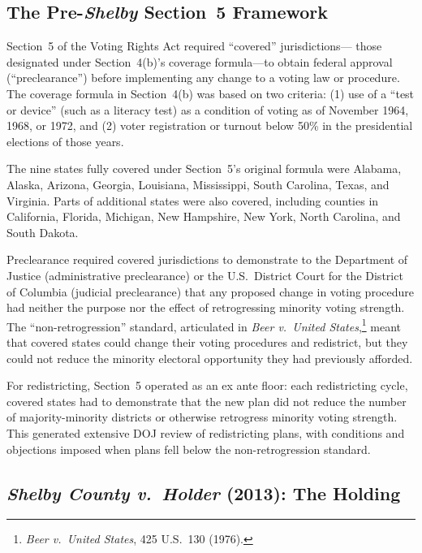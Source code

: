 \label{sec:background}

\subsection{The Pre-\textit{Shelby} Section~5 Framework}

Section~5 of the Voting Rights Act required ``covered'' jurisdictions---
those designated under Section~4(b)'s coverage formula---to obtain
federal approval (``preclearance'') before implementing any change to
a voting law or procedure. The coverage formula in Section~4(b) was
based on two criteria: (1) use of a ``test or device'' (such as a
literacy test) as a condition of voting as of November 1964, 1968,
or 1972, and (2) voter registration or turnout below 50\% in the
presidential elections of those years.

The nine states fully covered under Section~5's original formula
were Alabama, Alaska, Arizona, Georgia, Louisiana, Mississippi,
South Carolina, Texas, and Virginia. Parts of additional states
were also covered, including counties in California, Florida,
Michigan, New Hampshire, New York, North Carolina, and South Dakota.

Preclearance required covered jurisdictions to demonstrate to
the Department of Justice (administrative preclearance) or the
U.S.\ District Court for the District of Columbia (judicial preclearance)
that any proposed change in voting procedure had neither the purpose
nor the effect of retrogressing minority voting strength. The
``non-retrogression'' standard, articulated in
\textit{Beer v.\ United States},\footnote{\textit{Beer v.\ United States},
425 U.S.\ 130 (1976).} meant that covered states could change their
voting procedures and redistrict, but they could not reduce the
minority electoral opportunity they had previously afforded.

For redistricting, Section~5 operated as an ex ante floor: each
redistricting cycle, covered states had to demonstrate that the new
plan did not reduce the number of majority-minority districts or
otherwise retrogress minority voting strength. This generated extensive
DOJ review of redistricting plans, with conditions and objections
imposed when plans fell below the non-retrogression standard.

\subsection{\textit{Shelby County v.\ Holder} (2013): The Holding}

